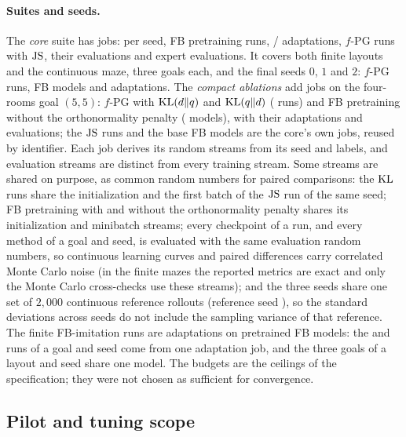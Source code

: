 \paragraph{Suites and seeds.}
The \emph{core} suite has  jobs: per seed,  FB pretraining runs,  \ERFB/\DMFB{} adaptations,  $f$-PG runs with $\mathrm{JS}$, their  evaluations and  expert evaluations. It covers both finite layouts and the continuous maze, three goals each, and the final seeds $0$, $1$ and $2$:  $f$-PG runs,  FB models and  adaptations.
The \emph{compact ablations} add  jobs on the four-rooms goal $(5,5)$: $f$-PG with $\mathrm{KL}(d\Vert q)$ and $\mathrm{KL}(q\Vert d)$ ( runs) and FB pretraining without the orthonormality penalty ( models), with their adaptations and evaluations; the $\mathrm{JS}$ runs and the base FB models are the core's own jobs, reused by identifier.
Each job derives its random streams from its seed and labels, and evaluation streams are distinct from every training stream.
Some streams are shared on purpose, as common random numbers for paired comparisons: the $\mathrm{KL}$ runs share the initialization and the first batch of the $\mathrm{JS}$ run of the same seed; FB pretraining with and without the orthonormality penalty shares its initialization and minibatch streams; every checkpoint of a run, and every method of a goal and seed, is evaluated with the same evaluation random numbers, so continuous learning curves and paired differences carry correlated Monte Carlo noise (in the finite mazes the reported metrics are exact and only the Monte Carlo cross-checks use these streams); and the three seeds share one set of $2{,}000$ continuous reference rollouts (reference seed ), so the standard deviations across seeds do not include the sampling variance of that reference.
The finite FB-imitation runs are  adaptations on  pretrained FB models: the \ERFB{} and \DMFB{} runs of a goal and seed come from one adaptation job, and the three goals of a layout and seed share one model.
The budgets are the ceilings of the specification; they were not chosen as sufficient for convergence.

\subsection{Pilot and tuning scope}\label{sec:m-pilot}

